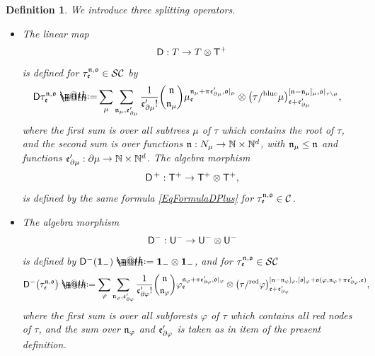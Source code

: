 \documentclass[10pt, reqno]{amsart}
\makeatletter
\numberwithin{subsection}{section}
\numberwithin{subsubsection}{subsection}
\numberwithin{equation}{section} %
\theoremstyle{mystyle}
\theoremstyle{mystyle2}
\newtheorem*{defn*} {Definition}
\theoremstyle{mystyle3}
\newcommand\bbN{\mathbb{N}}
\newcommand{\mcC}{\mathcal{C}}
\newcommand\mcS{\mathcal{S}}
\newcommand*{\defeq}{\mathrel{\rlap{%
                     \raisebox{0.3ex}{$\m@th\cdot$}}%
                     \raisebox{-0.3ex}{$\m@th\cdot$}}%
                     =}
\makeatother
\begin{document}
\begin{defn*} 
We introduce three splitting operators.
\begin{itemize}
\setlength{\itemsep}{0.1cm}

	\item[{\sf 1.}] The linear map 
	$$
	{\sf D}: T\to T\otimes {\sf T}^+
	$$ 
	is defined for $\tau_{\frak{e}}^{\frak{n},\frak{o}}\in\mcS\mcC$ by
\begin{equation} \label{EqFormulaDPlus}
\begin{split}
{\sf D}\tau_{\frak{e}}^{\frak{n},\frak{o}} 
\defeq & \sum_{\mu} \sum_{\frak{n}_\mu, \frak{e}'_{\partial\mu}} 
\frac{1}{\frak{e}'_{\partial\mu}!}{{\frak{n}}\choose{\frak{n}_\mu}}
\mu^{\frak{n}_\mu+\pi\frak{e}'_{\partial\mu},\frak{o}\vert_\mu}_{\frak{e}}
\otimes 
\big(\tau/^{\text{\rm blue}}\mu\big)^{[\frak{n}-\frak{n}_\mu]_\mu,\frak{o}\vert_{\tau\setminus\mu}}_{\frak{e}+\frak{e}'_{\partial\mu}},
\end{split}  \end{equation}
where the first sum is over all subtrees $\mu$ of $\tau$ which contains the root of $\tau$,
and the second sum is over functions $\frak{n}:N_\mu\to\bbN\times\bbN^d$, 
with $\frak{n}_\mu\leq \frak{n}$ and functions $\frak{e}'_{\partial\mu}: \partial\mu\rightarrow\bbN\times\bbN^d$.
The algebra morphism 
$$
{\sf D}^{\,+} : {\sf T}^+ \to {\sf T}^+\otimes {\sf T}^+,
$$ 
is defined by the same formula \eqref{EqFormulaDPlus} for $\tau_{\frak{e}}^{\frak{n},\frak{o}}\in{\mcC}$.   \vspace{0.15cm}

	\item[{\sf 2.}] The algebra morphism 
	$$
	{\sf D}^- : {\sf U}^-\to{\sf U}^-\otimes {\sf U}^-
	$$ 
	is defined by ${\sf D}^-({\bf1}_-) \defeq  {\bf1}_-\otimes{\bf1}_-$, and for $\tau_{\frak{e}}^{\frak{n},\frak{o}}\in\mcS\mcC$
\begin{equation*} \begin{split}
{\sf D}^-\big(\tau_{\frak{e}}^{\frak{n},\frak{o}} \big) 
&\defeq  \sum_{\varphi}\sum_{\frak{n}_\varphi, \frak{e}'_{\partial\varphi}} \frac{1}{\frak{e}'_{\partial\varphi}!}{{\frak{n}}\choose{\frak{n}_\varphi}}
\varphi^{\frak{n}_\varphi+\pi\frak{e}'_{\partial\varphi},\frak{o}\vert_\varphi}_{\frak{e}} 
\otimes \big(\tau/^{\text{\rm red}}\varphi\big)^{[\frak{n}-\frak{n_\varphi}]_\varphi,[\frak{o}]_\varphi+\frak{o}(\varphi,\frak{n}_\varphi+\pi\frak{e}_{\partial\varphi}',\frak{e})}_{\frak{e}+\frak{e}'_{\partial\varphi}},
\end{split}  \end{equation*}
where the first sum is over all subforests $\varphi$ of $\tau$ which contains all red nodes of $\tau$, and the sum over $\frak{n}_\varphi$ and $\frak{e}_{\partial\varphi}'$ is taken as in item {} of the present definition.   \vspace{0.15cm}


\end{itemize}
\end{defn*}
\end{document}
